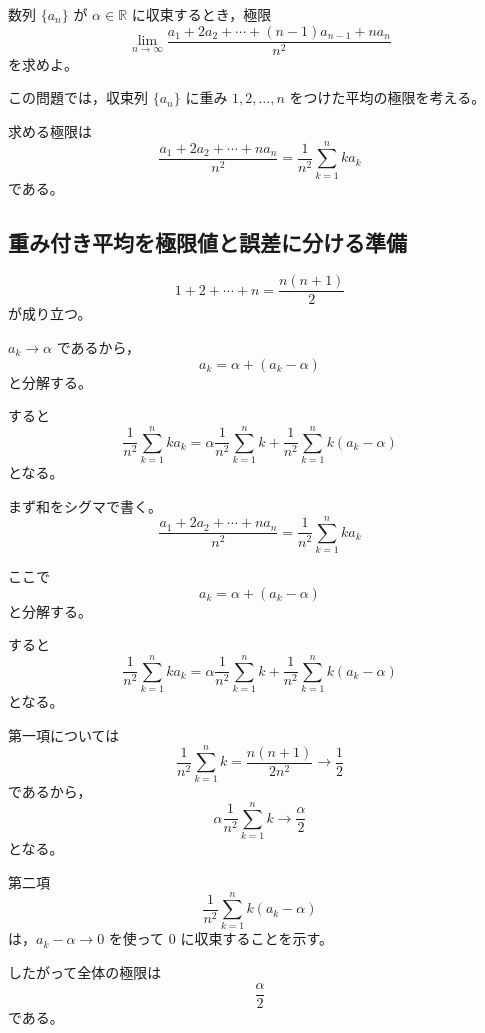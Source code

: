 \begin{exercise}
	数列 $\{a_n\}$ が $\alpha\in\mathbb{R}$ に収束するとき，極限
	\[
	\lim_{n\to\infty}
	\frac{a_1+2a_2+\cdots+(n-1)a_{n-1}+na_n}{n^2}
	\]
	を求めよ。
\end{exercise}
\begin{background}
	この問題では，収束列 $\{a_n\}$ に重み $1,2,\ldots,n$ をつけた平均の極限を考える。
	
	\begin{remark}
		求める極限は
		\[
		\frac{a_1+2a_2+\cdots+na_n}{n^2}
		=
		\frac{1}{n^2}\sum_{k=1}^{n}ka_k
		\]
		である。
	\end{remark}
	
	\subsection{重み付き平均を極限値と誤差に分ける準備}
	
	\begin{lemma}[自然数の和]
		\[
		1+2+\cdots+n
		=
		\frac{n(n+1)}{2}
		\]
		が成り立つ。
	\end{lemma}
	
	\begin{remark}
		$a_k\to\alpha$ であるから，
		\[
		a_k=\alpha+(a_k-\alpha)
		\]
		と分解する。
		
		すると
		\[
		\frac{1}{n^2}\sum_{k=1}^{n}ka_k
		=
		\alpha\frac{1}{n^2}\sum_{k=1}^{n}k
		+
		\frac{1}{n^2}\sum_{k=1}^{n}k(a_k-\alpha)
		\]
		となる。
	\end{remark}
\end{background}
\begin{strategy}
	まず和をシグマで書く。
	\[
	\frac{a_1+2a_2+\cdots+na_n}{n^2}
	=
	\frac{1}{n^2}\sum_{k=1}^{n}ka_k
	\]
	
	ここで
	\[
	a_k=\alpha+(a_k-\alpha)
	\]
	と分解する。
	
	すると
	\[
	\frac{1}{n^2}\sum_{k=1}^{n}ka_k
	=
	\alpha\frac{1}{n^2}\sum_{k=1}^{n}k
	+
	\frac{1}{n^2}\sum_{k=1}^{n}k(a_k-\alpha)
	\]
	となる。
	
	第一項については
	\[
	\frac{1}{n^2}\sum_{k=1}^{n}k
	=
	\frac{n(n+1)}{2n^2}
	\to
	\frac{1}{2}
	\]
	であるから，
	\[
	\alpha\frac{1}{n^2}\sum_{k=1}^{n}k
	\to
	\frac{\alpha}{2}
	\]
	となる。
	
	第二項
	\[
	\frac{1}{n^2}\sum_{k=1}^{n}k(a_k-\alpha)
	\]
	は，$a_k-\alpha\to 0$ を使って $0$ に収束することを示す。
	
	したがって全体の極限は
	\[
	\frac{\alpha}{2}
	\]
	である。
\end{strategy}